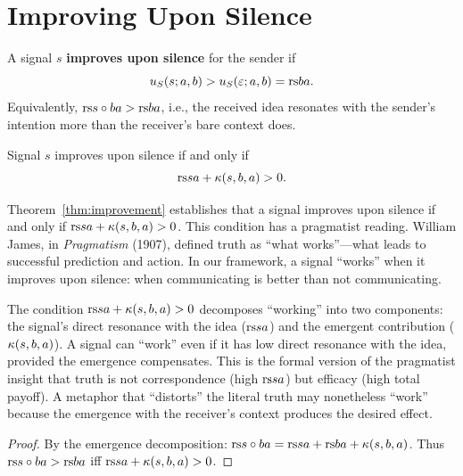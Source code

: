 


\section{Improving Upon Silence}

\begin{definition}
\label{def:improving}
A signal $s$ \textbf{improves upon silence} for the sender if
\[
  u_S(s; a, b) > u_S(\varepsilon; a, b) = \mathrm{rs}{b}{a}.
\]
Equivalently, $\mathrm{rs}{s \circ b}{a} > \mathrm{rs}{b}{a}$, i.e., the received idea
resonates with the sender's intention more than the receiver's bare context does.
\end{definition}

\begin{theorem}
\label{thm:improvement}
Signal $s$ improves upon silence if and only if
\[
  \mathrm{rs}{s}{a} + \kappa(s, b, a) > 0.
\]
\end{theorem}

\begin{interpretation}
\label{interp:ch14:improvement_pragmatism}
Theorem~\ref{thm:improvement} establishes that a signal improves upon
silence if and only if $\mathrm{rs}{s}{a} + \kappa(s, b, a) > 0$.  This condition
has a pragmatist reading.  William James, in \emph{Pragmatism} (1907),
defined truth as ``what works''---what leads to successful prediction and
action.  In our framework, a signal ``works'' when it improves upon silence:
when communicating is better than not communicating.

The condition $\mathrm{rs}{s}{a} + \kappa(s, b, a) > 0$ decomposes ``working''
into two components: the signal's direct resonance with the idea
($\mathrm{rs}{s}{a}$) and the emergent contribution ($\kappa(s, b, a)$).  A signal
can ``work'' even if it has low direct resonance with the idea, provided the
emergence compensates.  This is the formal version of the pragmatist insight
that truth is not correspondence (high $\mathrm{rs}{s}{a}$) but efficacy (high total
payoff).  A metaphor that ``distorts'' the literal truth may nonetheless
``work'' because the emergence with the receiver's context produces the
desired effect.
\end{interpretation}



\begin{proof}
By the emergence decomposition:
$\mathrm{rs}{s \circ b}{a} = \mathrm{rs}{s}{a} + \mathrm{rs}{b}{a} + \kappa(s, b, a)$.
Thus $\mathrm{rs}{s \circ b}{a} > \mathrm{rs}{b}{a}$ iff
$\mathrm{rs}{s}{a} + \kappa(s, b, a) > 0$.
\end{proof}

